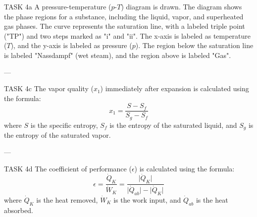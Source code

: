 TASK 4a  
A pressure-temperature (\(p\)-\(T\)) diagram is drawn. The diagram shows the phase regions for a substance, including the liquid, vapor, and superheated gas phases. The curve represents the saturation line, with a labeled triple point ("TP") and two steps marked as "i" and "ii". The x-axis is labeled as temperature (\(T\)), and the y-axis is labeled as pressure (\(p\)). The region below the saturation line is labeled "Nassdampf" (wet steam), and the region above is labeled "Gas".

---

TASK 4c  
The vapor quality (\(x_1\)) immediately after expansion is calculated using the formula:  
\[
x_1 = \frac{S - S_f}{S_g - S_f}
\]  
where \(S\) is the specific entropy, \(S_f\) is the entropy of the saturated liquid, and \(S_g\) is the entropy of the saturated vapor.

---

TASK 4d  
The coefficient of performance (\(\epsilon\)) is calculated using the formula:  
\[
\epsilon = \frac{\dot{Q}_K}{\dot{W}_K} = \frac{\lvert \dot{Q}_K \rvert}{\lvert \dot{Q}_{ab} \rvert - \lvert \dot{Q}_K \rvert}
\]  
where \(\dot{Q}_K\) is the heat removed, \(\dot{W}_K\) is the work input, and \(\dot{Q}_{ab}\) is the heat absorbed.